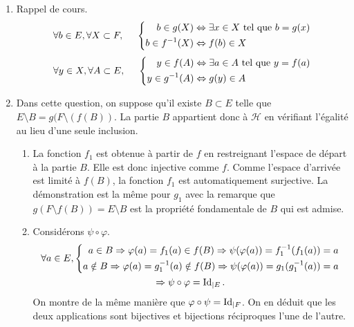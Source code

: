 \begin{enumerate}
  \item Rappel de cours.
\begin{displaymath}
\forall b \in E, \forall X \subset F,\hspace{.5cm}
\left\lbrace 
\begin{aligned}
  b\in g(X) &\Leftrightarrow \exists x \in X \text{ tel que } b=g(x)\\
  b\in f^{-1}(X) &\Leftrightarrow f(b) \in X
\end{aligned}
\right. 
\end{displaymath}
\begin{displaymath}
\forall y \in X, \forall A \subset E,\hspace{.5cm}
\left\lbrace 
\begin{aligned}
  y\in f(A) &\Leftrightarrow \exists a \in A \text{ tel que } y=f(a)\\
  y\in g^{-1}(A) &\Leftrightarrow g(y) \in A
\end{aligned}
\right. 
\end{displaymath}

  \item Dans cette question, on suppose qu'il existe $B\subset E$ telle que $E\setminus B = g(F\setminus(f(B))$. La partie $B$ appartient donc à $\mathcal{H}$ en vérifiant l'égalité au lieu d'une seule inclusion.
\begin{enumerate}
  \item La fonction $f_1$ est obtenue à partir de $f$ en restreignant l'espace de départ à la partie $B$. Elle est donc injective comme $f$. Comme l'espace d'arrivée est limité à $f(B)$, la fonction $f_1$ est automatiquement surjective. La démonstration est la même pour $g_1$ avec la remarque que $g(F\setminus f(B)) = E\setminus B$  est la propriété fondamentale de $B$ qui est admise. 
  \item Considérons $\psi \circ \varphi$.
\begin{multline*}
\forall a\in E,
\left\lbrace 
\begin{aligned}
a\in B \Rightarrow \varphi(a) = f_1(a)\in f(B) \Rightarrow \psi(\varphi(a))=f_1^{-1}(f_1(a)) = a \\
a\notin B \Rightarrow \varphi(a) = g_1^{-1}(a)\notin f(B) \Rightarrow \psi(\varphi(a))=g_1(g_1^{-1}(a)) = a 
\end{aligned}
\right. \\
\Rightarrow \psi \circ \varphi = \operatorname{Id}_{|E}.
\end{multline*}
On montre de la même manière que $\varphi \circ \psi = \operatorname{Id}_{|F}$. On en déduit que les deux applications sont bijectives et bijections réciproques l'une de l'autre.
\end{enumerate}


\end{enumerate}
